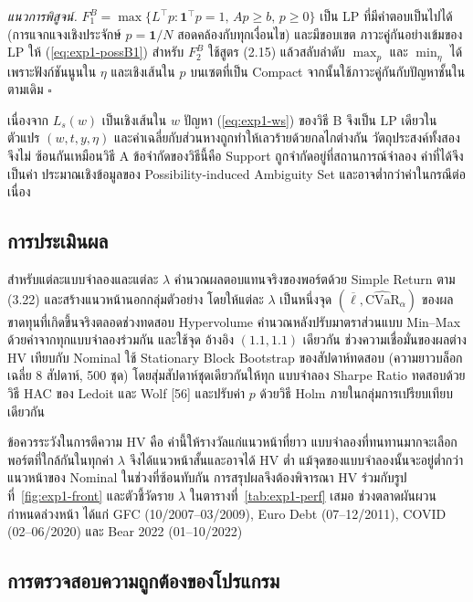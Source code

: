 \noindent\textit{แนวการพิสูจน์.} $F_1^B = \max\{L^\top p : \mathbf{1}^\top p = 1,\, Ap \ge b,\, p \ge 0\}$ เป็น LP
ที่มีคำตอบเป็นไปได้ (การแจกแจงเชิงประจักษ์ $p = \mathbf{1}/N$ สอดคล้องกับทุกเงื่อนไข) และมีขอบเขต
ภาวะคู่กันอย่างเข้มของ LP ให้ (\ref{eq:exp1-possB1}) สำหรับ $F_2^B$ ใช้สูตร (2.15) แล้วสลับลำดับ
$\max_p$ และ $\min_\eta$ ได้ เพราะฟังก์ชันนูนใน $\eta$ และเชิงเส้นใน $p$ บนเซตที่เป็น Compact
จากนั้นใช้ภาวะคู่กันกับปัญหาชั้นในตามเดิม \hfill$\square$

เนื่องจาก $L_s(w)$ เป็นเชิงเส้นใน $w$ ปัญหา (\ref{eq:exp1-ws}) ของวิธี B จึงเป็น LP เดียวในตัวแปร
$(w, t, y, \eta)$ และค่าเฉลี่ยกับส่วนหางถูกทำให้เลวร้ายด้วยกลไกต่างกัน วัตถุประสงค์ทั้งสองจึงไม่
ซ้อนกันเหมือนวิธี A ข้อจำกัดของวิธีนี้คือ Support ถูกจำกัดอยู่ที่สถานการณ์จำลอง ค่าที่ได้จึงเป็นค่า
ประมาณเชิงข้อมูลของ Possibility-induced Ambiguity Set และอาจต่ำกว่าค่าในกรณีต่อเนื่อง

\subsection{การประเมินผล}

สำหรับแต่ละแบบจำลองและแต่ละ $\lambda$ คำนวณผลตอบแทนจริงของพอร์ตด้วย Simple Return ตาม (3.22)
และสร้างแนวหน้านอกกลุ่มตัวอย่าง โดยให้แต่ละ $\lambda$ เป็นหนึ่งจุด
$(\overline{\ell}, \widehat{\mathrm{CVaR}}_\alpha)$ ของผลขาดทุนที่เกิดขึ้นจริงตลอดช่วงทดสอบ
Hypervolume คำนวณหลังปรับมาตราส่วนแบบ Min--Max ด้วยค่าจากทุกแบบจำลองร่วมกัน และใช้จุด
อ้างอิง $(1.1, 1.1)$ เดียวกัน ช่วงความเชื่อมั่นของผลต่าง HV เทียบกับ Nominal ใช้ Stationary Block
Bootstrap ของสัปดาห์ทดสอบ (ความยาวบล็อกเฉลี่ย 8 สัปดาห์, 500 ชุด) โดยสุ่มสัปดาห์ชุดเดียวกันให้ทุก
แบบจำลอง Sharpe Ratio ทดสอบด้วยวิธี HAC ของ Ledoit และ Wolf [56] และปรับค่า $p$ ด้วยวิธี
Holm ภายในกลุ่มการเปรียบเทียบเดียวกัน

ข้อควรระวังในการตีความ HV คือ ค่านี้ให้รางวัลแก่แนวหน้าที่ยาว แบบจำลองที่ทนทานมากจะเลือก
พอร์ตที่ใกล้กันในทุกค่า $\lambda$ จึงได้แนวหน้าสั้นและอาจได้ HV ต่ำ แม้จุดของแบบจำลองนั้นจะอยู่ต่ำกว่า
แนวหน้าของ Nominal ในช่วงที่ซ้อนทับกัน การสรุปผลจึงต้องพิจารณา HV ร่วมกับรูปที่~\ref{fig:exp1-front}
และตัวชี้วัดราย $\lambda$ ในตารางที่~\ref{tab:exp1-perf} เสมอ ช่วงตลาดผันผวนกำหนดล่วงหน้า ได้แก่ GFC (10/2007--03/2009),
Euro Debt (07--12/2011), COVID (02--06/2020) และ Bear 2022 (01--10/2022)

\subsection{การตรวจสอบความถูกต้องของโปรแกรม}

